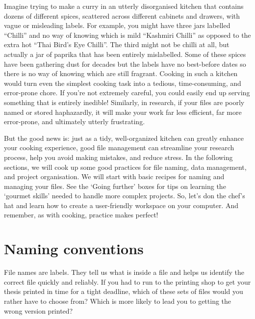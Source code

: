 \documentclass[
  letterpaper,
  DIV=11,
  numbers=noendperiod]{scrreprt}
\begin{document}
Imagine trying to make a curry in an utterly disorganised kitchen that
contains dozens of different spices, scattered across different cabinets
and drawers, with vague or misleading labels. For example, you might
have three jars labelled ``Chilli'' and no way of knowing which is mild
``Kashmiri Chilli'' as opposed to the extra hot ``Thai Bird's Eye
Chilli''. The third might not be chilli at all, but actually a jar of
paprika that has been entirely mislabelled. Some of these spices have
been gathering dust for decades but the labels have no best-before dates
so there is no way of knowing which are still fragrant. Cooking in such
a kitchen would turn even the simplest cooking task into a tedious,
time-consuming, and error-prone chore. If you're not extremely careful,
you could easily end up serving something that is entirely inedible!
Similarly, in research, if your files are poorly named or stored
haphazardly, it will make your work far less efficient, far more
error-prone, and ultimately utterly frustrating.

But the good news is: just as a tidy, well-organized kitchen can greatly
enhance your cooking experience, good file management can streamline
your research process, help you avoid making mistakes, and reduce
stress. In the following sections, we will cook up some good practices
for file naming, data management, and project organisation. We will
start with basic recipes for naming and managing your files. See the
`Going further' boxes for tips on learning the `gourmet skills' needed
to handle more complex projects. So, let's don the chef's hat and learn
how to create a user-friendly workspace on your computer. And remember,
as with cooking, practice makes perfect! 🧑🏽‍🍳

\section{Naming conventions}\label{naming-conventions}

File names are labels. They tell us what is inside a file and helps us
identify the correct file quickly and reliably. If you had to run to the
printing shop to get your thesis printed in time for a tight deadline,
which of these sets of files would you rather have to choose from? Which
is more likely to lead you to getting the wrong version printed?
\end{document}
